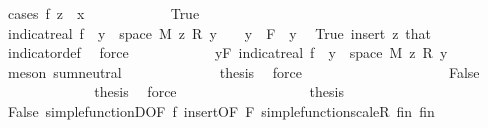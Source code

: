 \begin{isabellebody}
\ {\isacharparenleft}{\kern0pt}cases\ {\isachardoublequoteopen}f\ z\ {\isacharequal}{\kern0pt}\ x{\isachardoublequoteclose}{\isacharparenright}{\kern0pt}\isanewline
\ \ \ \ \ \ \ \ \ \ \isamarkupfalse%
\ True\isanewline
\ \ \ \ \ \ \ \ \ \ \isamarkupfalse%
\ {\isachardoublequoteopen}indicat{\isacharunderscore}{\kern0pt}real\ {\isacharparenleft}{\kern0pt}f\ {\isacharminus}{\kern0pt}{\isacharbackquote}{\kern0pt}\ {\isacharbraceleft}{\kern0pt}y{\isacharbraceright}{\kern0pt}\ {\isasyminter}\ space\ M{\isacharparenright}{\kern0pt}\ z\ {\isacharasterisk}{\kern0pt}\isactrlsub R\ y\ {\isacharequal}{\kern0pt}\ {}{\isachardoublequoteclose}\ \ {\isachardoublequoteopen}y\ {\isasymin}\ F{\isachardoublequoteclose}\ \ y\ \isamarkupfalse%
\ True\ insert{\isacharparenleft}{\kern0pt}{}{\isacharparenright}{\kern0pt}\ z\ that\ {}\ \isamarkupfalse%
\ indicator{\isacharunderscore}{\kern0pt}def\ \isamarkupfalse%
\ force\isanewline
\ \ \ \ \ \ \ \ \ \ \isamarkupfalse%
\ {\isachardoublequoteopen}{\isacharparenleft}{\kern0pt}{\isasymSum}y{\isasymin}F{\isachardot}{\kern0pt}\ indicat{\isacharunderscore}{\kern0pt}real\ {\isacharparenleft}{\kern0pt}f\ {\isacharminus}{\kern0pt}{\isacharbackquote}{\kern0pt}\ {\isacharbraceleft}{\kern0pt}y{\isacharbraceright}{\kern0pt}\ {\isasyminter}\ space\ M{\isacharparenright}{\kern0pt}\ z\ {\isacharasterisk}{\kern0pt}\isactrlsub R\ y{\isacharparenright}{\kern0pt}\ {\isacharequal}{\kern0pt}\ {}{\isachardoublequoteclose}\ \isamarkupfalse%
\ {\isacharparenleft}{\kern0pt}meson\ sum{\isachardot}{\kern0pt}neutral{\isacharparenright}{\kern0pt}\isanewline
\ \ \ \ \ \ \ \ \ \ \isamarkupfalse%
\ \isamarkupfalse%
\ {\isacharquery}{\kern0pt}thesis\ \isamarkupfalse%
\ force\isanewline
\ \ \ \ \ \ \ \ \isamarkupfalse%
\isanewline
\ \ \ \ \ \ \ \ \ \ \isamarkupfalse%
\ False\isanewline
\ \ \ \ \ \ \ \ \ \ \isamarkupfalse%
\ \isamarkupfalse%
\ {\isacharquery}{\kern0pt}thesis\ \isamarkupfalse%
\ force\isanewline
\ \ \ \ \ \ \ \ \isamarkupfalse%
\isanewline
\ \ \ \ \ \ \ \ \isamarkupfalse%
\ {\isacharquery}{\kern0pt}thesis\ \isamarkupfalse%
\ False\ simple{\isacharunderscore}{\kern0pt}functionD{\isacharparenleft}{\kern0pt}{}{\isacharparenright}{\kern0pt}{\isacharbrackleft}{\kern0pt}OF\ f{\isacharparenleft}{\kern0pt}{}{\isacharparenright}{\kern0pt}{\isacharbrackright}{\kern0pt}\ insert{\isacharparenleft}{\kern0pt}{}{\isacharcomma}{\kern0pt}{}{\isacharparenright}{\kern0pt}{\isacharbrackleft}{\kern0pt}OF\ F{\isacharbrackright}{\kern0pt}\ simple{\isacharunderscore}{\kern0pt}function{\isacharunderscore}{\kern0pt}scaleR\ fin{\isacharunderscore}{\kern0pt}{}\ fin{\isacharunderscore}{\kern0pt}{}\ \isamarkupfalse%

\end{isabellebody}
